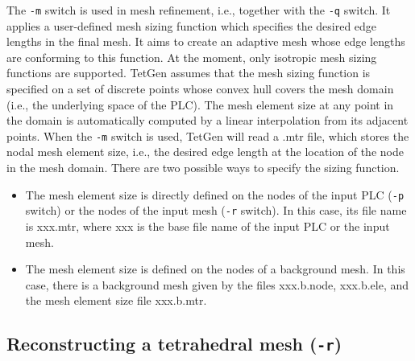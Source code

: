 \documentclass[12pt,twoside,a4paper]{article}
\numberwithin{equation}{section}
\newcommand{\tetp}{\texttt{-p}}
\newcommand{\tetq}{\texttt{-q}}
\newcommand{\tetr}{\texttt{-r}}
\newcommand{\tetm}{\texttt{-m}}
\begin{document}
The \tetm{} switch is used in mesh refinement, i.e., together with the
\tetq{} switch. It applies a user-defined mesh sizing function which
specifies the desired edge lengths in the final mesh. It aims to create an
adaptive mesh whose edge lengths are conforming to this function. At the
moment, only isotropic mesh sizing functions are supported.  TetGen assumes
that the mesh sizing function is specified on a set of discrete points whose
convex hull covers the mesh domain (i.e., the underlying space of the PLC).
The mesh element size at any point in the domain is automatically computed
by a linear interpolation from its adjacent points.  When the \tetm{} switch
is used, TetGen will read a .mtr file, which stores the nodal mesh element
size, i.e., the desired edge length at the location of the node in the mesh
domain. There are two possible ways to specify the sizing function.

\begin{itemize}
\item The mesh element size is directly defined on the nodes of the input
  PLC (\tetp{} switch) or the nodes of the input mesh (\tetr{} switch). In
  this case, its file name is xxx.mtr, where xxx is the base file name of
  the input PLC or the input mesh.
\item The mesh element size is defined on the nodes of a background mesh.
  In this case, there is a background mesh given by the files xxx.b.node,
  xxx.b.ele, and the mesh element size file xxx.b.mtr.
\end{itemize}


\subsection[Reconstructing a tetrahedral mesh]
{Reconstructing a tetrahedral mesh (\tetr{})~\cite[p. 42]{Si2013}}
\end{document}
